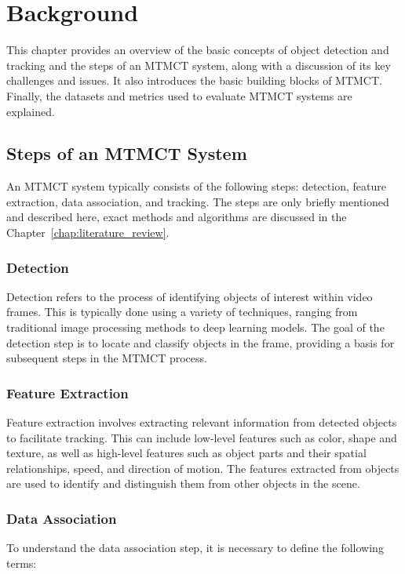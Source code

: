 \chapter{Background}\label{chap:background}
This chapter provides an overview of the basic concepts of object detection and tracking and the steps of an MTMCT system, along with a discussion of its key challenges and issues. It also introduces the basic building blocks of MTMCT. Finally, the datasets and metrics used to evaluate MTMCT systems are explained.

\section{Steps of an MTMCT System}\label{sec:steps_of_an_mtmct_system}
An MTMCT system typically consists of the following steps: detection, feature extraction, data association, and tracking. The steps are only briefly mentioned and described here, exact methods and algorithms are discussed in the Chapter~\ref{chap:literature_review}.

\subsection{Detection}\label{subsec:detection}
Detection refers to the process of identifying objects of interest within video frames. This is typically done using a variety of techniques, ranging from traditional image processing methods to deep learning models. The goal of the detection step is to locate and classify objects in the frame, providing a basis for subsequent steps in the MTMCT process.

\subsection{Feature Extraction}\label{subsec:feature_extraction}
Feature extraction involves extracting relevant information from detected objects to facilitate tracking. This can include low-level features such as color, shape and texture, as well as high-level features such as object parts and their spatial relationships, speed, and direction of motion. The features extracted from objects are used to identify and distinguish them from other objects in the scene.

\subsection{Data Association}\label{subsec:data_association}
To understand the data association step, it is necessary to define the following terms:

